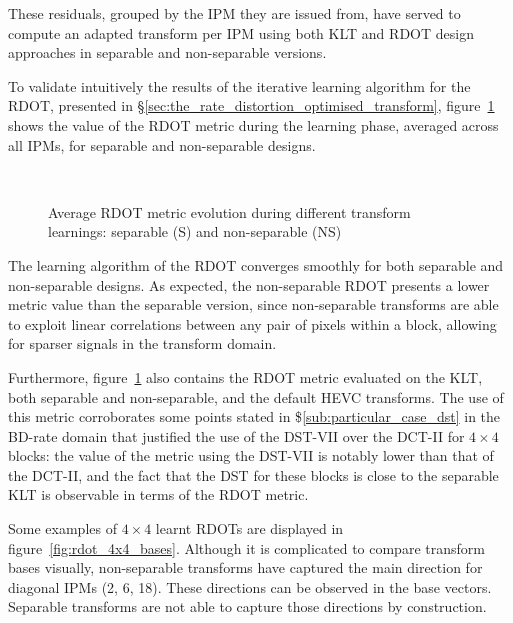 \documentclass[11pt,a4paper,openright,twoside]{book}
\numberwithin{equation}{section} %
\numberwithin{figure}{section} %
\numberwithin{table}{section} %
\begin{document}
These residuals, grouped by the \ac{IPM} they are issued from, have served to
compute an adapted transform per \ac{IPM} using both \ac{KLT} and \ac{RDOT}
design approaches in separable and non-separable versions.

To validate intuitively the results of the iterative learning algorithm for
the \ac{RDOT}, presented in
\S\ref{sec:the_rate_distortion_optimised_transform},
figure~\ref{fig:rdot_metric_learning} shows the value of the \ac{RDOT} metric
during the learning phase, averaged across all \acp{IPM}, for separable and
non-separable designs.

\begin{figure}[tb]
	\centering
	\\	
	\caption{Average \ac{RDOT} metric evolution during different transform
	learnings: separable (S) and non-separable (NS)}
	\label{fig:rdot_metric_learning}
\end{figure}

The learning algorithm of the \ac{RDOT} converges smoothly for both separable
and non-separable designs.
As expected, the non-separable \ac{RDOT} presents a lower metric value than
the separable version, since non-separable transforms are able to exploit
linear correlations between any pair of pixels within a block, allowing for
sparser signals in the transform domain.

Furthermore, figure~\ref{fig:rdot_metric_learning} also contains the \ac{RDOT}
metric evaluated on the \ac{KLT}, both separable and non-separable, and the
default \ac{HEVC} transforms.
The use of this metric corroborates some points stated in
\$\ref{sub:particular_case_dst} in the \ac{BD}-rate domain that justified the
use of the \ac{DST}-VII over the \ac{DCT}-II for $4\times4$ blocks:
the value of the metric using the \ac{DST}-VII is notably lower than that of
the \ac{DCT}-II, and the fact that the \ac{DST} for these blocks is close to
the separable \ac{KLT} is observable in terms of the \ac{RDOT} metric.

Some examples of $4\times4$ learnt \acp{RDOT} are displayed in
figure~\ref{fig:rdot_4x4_bases}.
Although it is complicated to compare transform bases visually, non-separable
transforms have captured the main direction for diagonal \acp{IPM} (2, 6, 18).
These directions can be observed in the base vectors.
Separable transforms are not able to capture those directions by construction.
\end{document}
